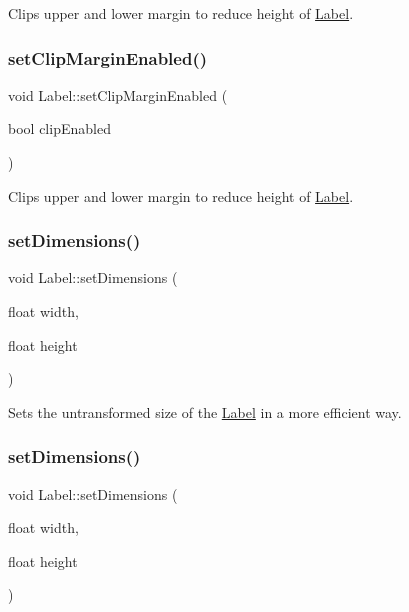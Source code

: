 Clips upper and lower margin to reduce height of \hyperlink{classLabel}{Label}. \mbox{\label{classLabel_ae882e2499324c73c9852fb573aa0de5c}} 
\subsubsection{\texorpdfstring{set\+Clip\+Margin\+Enabled()}{setClipMarginEnabled()}\hspace{0.1cm}{\footnotesize\ttfamily [2/2]}}
{\footnotesize\ttfamily void Label\+::set\+Clip\+Margin\+Enabled (\begin{DoxyParamCaption}\item[{bool}]{clip\+Enabled }\end{DoxyParamCaption})\hspace{0.3cm}{\ttfamily [inline]}}

Clips upper and lower margin to reduce height of \hyperlink{classLabel}{Label}. \mbox{\label{classLabel_a7e555d440bd15d0cc955c725eedffe4f}} 
\subsubsection{\texorpdfstring{set\+Dimensions()}{setDimensions()}\hspace{0.1cm}{\footnotesize\ttfamily [1/2]}}
{\footnotesize\ttfamily void Label\+::set\+Dimensions (\begin{DoxyParamCaption}\item[{float}]{width,  }\item[{float}]{height }\end{DoxyParamCaption})}

Sets the untransformed size of the \hyperlink{classLabel}{Label} in a more efficient way. \mbox{\label{classLabel_a7e555d440bd15d0cc955c725eedffe4f}} 
\subsubsection{\texorpdfstring{set\+Dimensions()}{setDimensions()}\hspace{0.1cm}{\footnotesize\ttfamily [2/2]}}
{\footnotesize\ttfamily void Label\+::set\+Dimensions (\begin{DoxyParamCaption}\item[{float}]{width,  }\item[{float}]{height }\end{DoxyParamCaption})}

